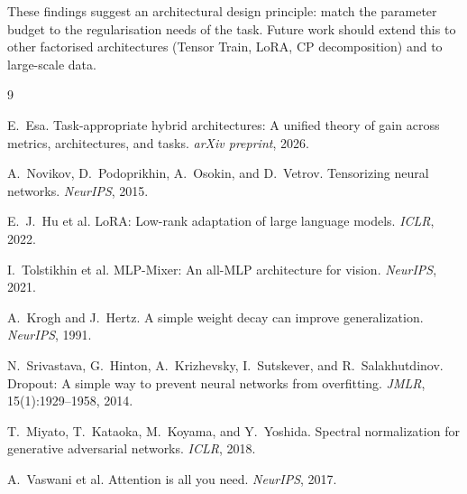 \documentclass[11pt,a4paper]{article}
\begin{document}
These findings suggest an architectural design principle: match
the parameter budget to the regularisation needs of the task.
Future work should extend this to other factorised architectures
(Tensor Train, LoRA, CP decomposition) and to large-scale data.



\begin{thebibliography}{9}

E.~Esa. Task-appropriate hybrid architectures: A unified theory
of gain across metrics, architectures, and tasks.
\emph{arXiv preprint}, 2026.

A.~Novikov, D.~Podoprikhin, A.~Osokin, and D.~Vetrov.
Tensorizing neural networks. \emph{NeurIPS}, 2015.

E.~J.~Hu et al. LoRA: Low-rank adaptation of large language
models. \emph{ICLR}, 2022.

I.~Tolstikhin et al. MLP-Mixer: An all-MLP architecture for
vision. \emph{NeurIPS}, 2021.

A.~Krogh and J.~Hertz. A simple weight decay can improve
generalization. \emph{NeurIPS}, 1991.

N.~Srivastava, G.~Hinton, A.~Krizhevsky, I.~Sutskever, and
R.~Salakhutdinov. Dropout: A simple way to prevent neural
networks from overfitting. \emph{JMLR}, 15(1):1929--1958, 2014.

T.~Miyato, T.~Kataoka, M.~Koyama, and Y.~Yoshida. Spectral
normalization for generative adversarial networks.
\emph{ICLR}, 2018.

A.~Vaswani et al. Attention is all you need. \emph{NeurIPS}, 2017.

\end{thebibliography}
\end{document}
